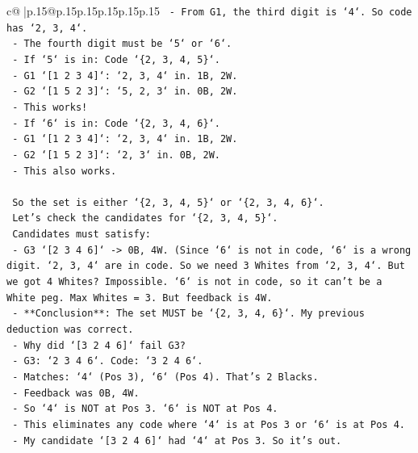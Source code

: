 \documentclass{article}
\begin{document}
{\begin{supertabular}{c@{$\;$}|p{.15\linewidth}@{}p{.15\linewidth}p{.15\linewidth}p{.15\linewidth}p{.15\linewidth}p{.15\linewidth}}
{{{\texttt{        {-} From G1, the third digit is `4`. So code has `2, 3, 4`.} \\
\texttt{        {-} The fourth digit must be `5` or `6`.} \\
\texttt{        {-} If `5` is in: Code `\{2, 3, 4, 5\}`.} \\
\texttt{          {-} G1 `{[}1 2 3 4{]}`: `2, 3, 4` in. 1B, 2W.} \\
\texttt{          {-} G2 `{[}1 5 2 3{]}`: `5, 2, 3` in. 0B, 2W.} \\
\texttt{          {-} This works!} \\
\texttt{        {-} If `6` is in: Code `\{2, 3, 4, 6\}`.} \\
\texttt{          {-} G1 `{[}1 2 3 4{]}`: `2, 3, 4` in. 1B, 2W.} \\
\texttt{          {-} G2 `{[}1 5 2 3{]}`: `2, 3` in. 0B, 2W.} \\
\texttt{          {-} This also works.} \\
\\ 
\texttt{    So the set is either `\{2, 3, 4, 5\}` or `\{2, 3, 4, 6\}`.} \\
\texttt{    Let's check the candidates for `\{2, 3, 4, 5\}`.} \\
\texttt{    Candidates must satisfy:} \\
\texttt{    {-} G3 `{[}2 3 4 6{]}` {-}> 0B, 4W. (Since `6` is not in code, `6` is a wrong digit. `2, 3, 4` are in code. So we need 3 Whites from `2, 3, 4`. But we got 4 Whites? Impossible. `6` is not in code, so it can't be a White peg. Max Whites = 3. But feedback is 4W.} \\
\texttt{    {-} **Conclusion**: The set MUST be `\{2, 3, 4, 6\}`. My previous deduction was correct.} \\
\texttt{    {-} Why did `{[}3 2 4 6{]}` fail G3?} \\
\texttt{      {-} G3: `2 3 4 6`. Code: `3 2 4 6`.} \\
\texttt{      {-} Matches: `4` (Pos 3), `6` (Pos 4). That's 2 Blacks.} \\
\texttt{      {-} Feedback was 0B, 4W.} \\
\texttt{      {-} So `4` is NOT at Pos 3. `6` is NOT at Pos 4.} \\
\texttt{      {-} This eliminates any code where `4` is at Pos 3 or `6` is at Pos 4.} \\
\texttt{      {-} My candidate `{[}3 2 4 6{]}` had `4` at Pos 3. So it's out.} \\
\\ 
}}}
\end{supertabular}}
\end{document}
